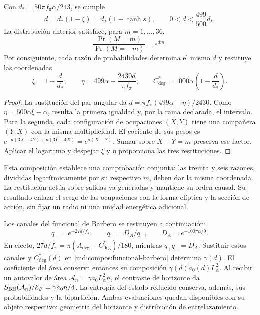 \begin{proposition}
\label{ins29:vii:curva}
Con \(d_*=50\pi f_\pi\alpha/243\), se cumple
\[
 d=d_*(1-\xi)=d_*(1-\tanh s),\qquad
 0<d<\frac{499}{500}d_*.
\]
La distribución anterior satisface, para \(m=1,\ldots,36\),
\[
 \frac{\Pr(M=m)}{\Pr(M=-m)}=e^{dm}.
\]
Por consiguiente, cada razón de probabilidades determina el mismo \(d\)
y restituye las coordenadas
\[
 \xi=1-\frac d{d_*},\qquad
 \eta=499\alpha-\frac{2430d}{\pi f_\pi},\qquad
 C^*_{\deg}=1000\alpha\left(1-\frac d{d_*}\right).
\]
\end{proposition}
\begin{proof}
La sustitución del par angular da
\(d=\pi f_\pi(499\alpha-\eta)/2430\).
Como \(\eta=500\alpha\xi-\alpha\), resulta la primera igualdad y,
por la rama declarada, el intervalo. Para la segunda, cada configuración
de ocupaciones \((X,Y)\) tiene una compañera \((Y,X)\) con la misma
multiplicidad. El cociente de sus pesos es
\(e^{-d(3X+4Y)+d(3Y+4X)}=e^{d(X-Y)}\).
Sumar sobre \(X-Y=m\) preserva ese factor. Aplicar el logaritmo y
despejar \(\xi\) y \(\eta\) proporciona las tres restituciones.
\end{proof}

Esta composición establece una comprobación conjunta: las treinta y seis
razones, divididas logarítmicamente por su respectivo \(m\), deben dar
la misma coordenada. La restitución actúa sobre salidas ya generadas y
mantiene su orden causal. Su resultado enlaza el sesgo de las ocupaciones
con la forma elíptica y la sección de acción, sin fijar un radio ni una
unidad energética adicional.

Los canales del funcional de Barbero se restituyen a continuación:
\[
 q_-=e^{-27d/f_\pi},\qquad
 q_+=D_A/q_-,\qquad D_A=e^{-100\pi\alpha/9}.
\]
En efecto, \(27d/f_\pi=\pi(A_{\deg}-C^*_{\deg})/180\), mientras
\(q_+q_-=D_A\). Sustituir estos canales y \(C^*_{\deg}(d)\) en
\eqref{md:compos:funcional-barbero} determina \(\gamma(d)\).
El coeficiente del área conserva entonces su composición
\(\gamma(d)a_0(d)L_\alpha^2\). Al recibir un autovalor de área
\(\mathcal A_n=\gamma a_0L_\alpha^2n\), el contraste de horizonte
da \(S_{\rm BH}(\mathcal A_n)/k_B=\gamma a_0n/4\).
La entropía del estado reducido conserva, además, sus probabilidades y
la bipartición. Ambas evaluaciones quedan disponibles con su objeto
respectivo: geometría del horizonte y distribución de entrelazamiento.
